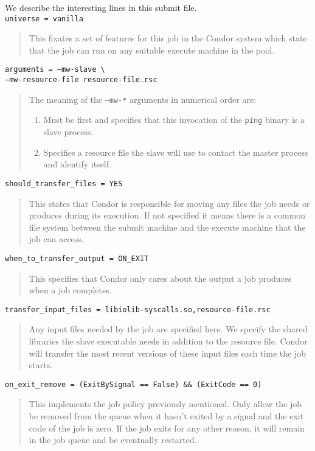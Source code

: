 \documentclass[titlepage,12pt]{book}
\newcommand{\exec}[1]{\texttt{#1}\xspace}
\newenvironment{explainline}[1]
	{\noindent\texttt{#1}\begin{quotation}}
	{\end{quotation}}
\begin{document}
We describe the interesting lines in this submit file.
\\

\begin{explainline}
{universe = vanilla}
This fixates a set of features for this job in the Condor system which
state that the job can run on any suitable execute machine in the pool.
\end{explainline}

\begin{explainline}
{arguments = --mw-slave \textbackslash \\ \indent
--mw-resource-file resource-file.rsc}
The meaning of the \texttt{--mw-*} arguments in numerical order are:
\begin{enumerate}
\item Must be first and specifies that this invocation of the \exec{ping}
	binary is a slave process.
\item Specifies a resource file the slave will use to contact the master 
	process and identify itself.
\end{enumerate}
\end{explainline}

\begin{explainline}
{should\_transfer\_files = YES}
This states that Condor is responsible for moving any files the job
needs or produces during its execution. If not specified it means
there is a common file system between the submit machine and the
execute machine that the job can access.
\end{explainline}

\begin{explainline}
{when\_to\_transfer\_output = ON\_EXIT}
This specifies that Condor only cares about the output a job produces when
a job completes.
\end{explainline}

\begin{explainline}
{transfer\_input\_files = libiolib-syscalls.so,resource-file.rsc}
Any input files needed by the job are specified here. We specify
the shared libraries the slave executable needs in addition to the
resource file. Condor will transfer the most recent versions of these
input files each time the job starts.
\end{explainline}

\begin{explainline}
{on\_exit\_remove = (ExitBySignal == False) \&\& (ExitCode == 0)}
This implements the job policy previously mentioned. Only allow the job be
removed from the queue when it hasn't exited by a signal and the exit code
of the job is zero. If the job exits for any other reason, it will remain 
in the job queue and be eventually restarted.
\end{explainline}
\end{document}
